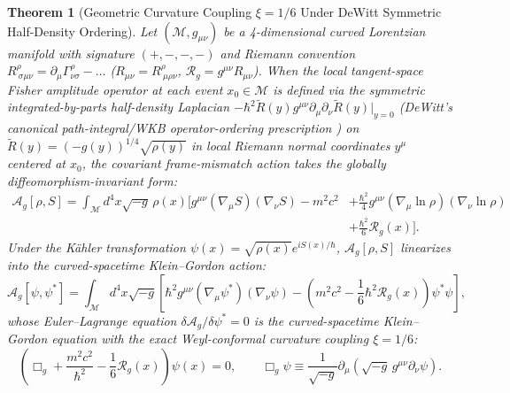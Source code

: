 \documentclass[11pt, a4paper]{article}
\newtheorem{theorem}{Theorem}[section]
\theoremstyle{definition}
\begin{document}
\begin{theorem}[Geometric Curvature Coupling $\xi = 1/6$ Under DeWitt Symmetric Half-Density Ordering]
\label{thm:conformal_coupling}
Let $(\mathcal{M}, g_{\mu\nu})$ be a 4-dimensional curved Lorentzian manifold with signature $(+,-,-,-)$ and Riemann convention $R^\rho_{\ \sigma\mu\nu} = \partial_\mu\Gamma^\rho_{\nu\sigma} - \dots$ ($R_{\mu\nu} = R^\rho_{\ \mu\rho\nu}$, $\mathcal{R}_g = g^{\mu\nu}R_{\mu\nu}$). When the local tangent-space Fisher amplitude operator at each event $x_0 \in \mathcal{M}$ is defined via the symmetric integrated-by-parts half-density Laplacian $-\hbar^2 \tilde{R}(y)g^{\mu\nu}\partial_\mu\partial_\nu\tilde{R}(y)\big|_{y=0}$ (DeWitt's canonical path-integral/WKB operator-ordering prescription \cite{DeWitt1957}) on $\tilde{R}(y) = (-g(y))^{1/4}\sqrt{\rho(y)}$ in local Riemann normal coordinates $y^\mu$ centered at $x_0$, the covariant frame-mismatch action takes the globally diffeomorphism-invariant form:
\begin{equation}
\label{eq:curved_mismatch_action}
\begin{aligned}
\mathcal{A}_g[\rho, S] = \int_{\mathcal{M}} d^4x \sqrt{-g} \, \rho(x) \bigg[ g^{\mu\nu}(\nabla_\mu S)(\nabla_\nu S) - m^2 c^2 &+ \frac{\hbar^2}{4} g^{\mu\nu}(\nabla_\mu \ln\rho)(\nabla_\nu \ln\rho) \\
&+ \frac{\hbar^2}{6} \mathcal{R}_g(x) \bigg].
\end{aligned}
\end{equation}
Under the K\"{a}hler transformation $\psi(x) = \sqrt{\rho(x)}e^{iS(x)/\hbar}$, $\mathcal{A}_g[\rho, S]$ linearizes into the curved-spacetime Klein--Gordon action:
\begin{equation}
\label{eq:curved_KG_action_thm}
\mathcal{A}_g[\psi, \psi^*] = \int_{\mathcal{M}} d^4x \sqrt{-g} \left[ \hbar^2 g^{\mu\nu}(\nabla_\mu \psi^*)(\nabla_\nu \psi) - \left( m^2 c^2 - \frac{1}{6}\hbar^2 \mathcal{R}_g(x) \right) \psi^* \psi \right],
\end{equation}
whose Euler--Lagrange equation $\delta \mathcal{A}_g / \delta \psi^* = 0$ is the curved-spacetime Klein--Gordon equation with the exact Weyl-conformal curvature coupling $\xi = 1/6$:
\begin{equation}
\label{eq:curved_KG_eq_thm}
\left( \Box_g + \frac{m^2 c^2}{\hbar^2} - \frac{1}{6} \mathcal{R}_g(x) \right) \psi(x) = 0, \qquad \Box_g \psi \equiv \frac{1}{\sqrt{-g}}\partial_\mu \left( \sqrt{-g}\,g^{\mu\nu}\partial_\nu \psi \right).
\end{equation}
\end{theorem}
\end{document}
